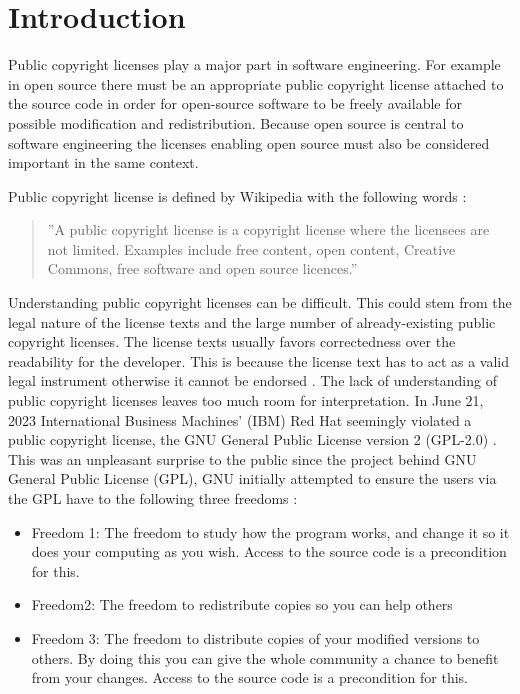 \chapter{Introduction\label{intro}}

Public copyright licenses play a major part in software engineering. For example in open source there must be an appropriate public copyright license attached to the source code in order for open-source software to be freely available for possible modification and redistribution. Because open source is central to software engineering the licenses enabling open source must also be considered important in the same context.

Public copyright license is defined by Wikipedia with the following words \citep{wiki:publiclicenses}:
\begin{quote}
	''A public copyright license is a copyright license where the licensees are not limited. Examples include free content, open content, Creative Commons, free software and open source licences.''
\end{quote}

Understanding public copyright licenses can be difficult. This could stem from the legal nature of the license texts and the large number of already-existing public copyright licenses. The license texts usually favors correctedness over the readability for the developer. This is because the license text has to act as a valid legal instrument otherwise it cannot be endorsed \citep{ferguson2006gpl}. The lack of understanding of public copyright licenses leaves too much room for interpretation. In June 21, 2023 International Business Machines' (IBM) Red Hat seemingly violated a public copyright license, the GNU General Public License version 2 (GPL-2.0) \citep{sfc:rhel} \citep{ibm:rhel}. This was an unpleasant surprise to the public since the project behind GNU General Public License (GPL), GNU initially attempted to ensure the users via the GPL have to the following three freedoms \citep{gnu:free}:
\begin{itemize}
	\item Freedom 1:	The freedom to study how the program works, and change it so it does your computing as you wish. Access to the source code is a precondition for this.
	\item Freedom2: The freedom to redistribute copies so you can help others
	\item Freedom 3:	The freedom to distribute copies of your modified versions to others. By doing this you can give the whole community a chance to benefit from your changes. Access to the source code is a precondition for this.
\end{itemize}

